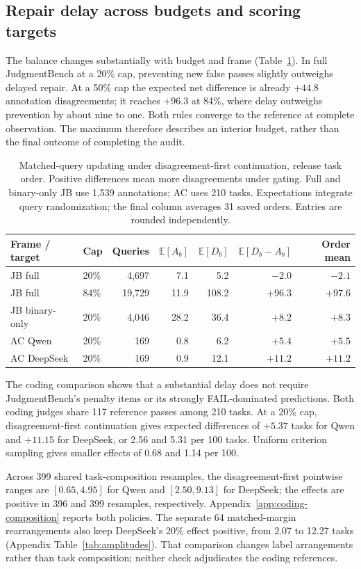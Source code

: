 \documentclass[10pt,letterpaper]{article}
\newcommand{\E}{\mathbb{E}}
\begin{document}
\subsection{Repair delay across budgets and scoring targets}
The balance changes substantially with budget and frame (Table~\ref{tab:update}). In full JudgmentBench at a 20\% cap, preventing new false passes slightly outweighs delayed repair. At a 50\% cap the expected net difference is already $+44.8$ annotation disagreements; it reaches $+96.3$ at 84\%, where delay outweighs prevention by about nine to one. Both rules converge to the reference at complete observation. The maximum therefore describes an interior budget, rather than the final outcome of completing the audit.

\begin{table}[t]
\centering\small
\caption{Matched-query updating under disagreement-first continuation, release task order. Positive differences mean more disagreements under gating. Full and binary-only JB use 1,539 annotations; AC uses 210 tasks. Expectations integrate query randomization; the final column averages 31 saved orders. Entries are rounded independently.}
\label{tab:update}
\begin{tabular}{llrrrrr}
\toprule
Frame / target & Cap & Queries & $\E[A_b]$ & $\E[D_b]$ & $\E[D_b-A_b]$ & Order mean\\
\midrule
JB full & 20\% & 4,697 & 7.1 & 5.2 & $-2.0$ & $-2.1$\\
JB full & 84\% & 19,729 & 11.9 & 108.2 & $+96.3$ & $+97.6$\\
JB binary-only & 20\% & 4,046 & 28.2 & 36.4 & $+8.2$ & $+8.3$\\
AC Qwen & 20\% & 169 & 0.8 & 6.2 & $+5.4$ & $+5.5$\\
AC DeepSeek & 20\% & 169 & 0.9 & 12.1 & $+11.2$ & $+11.2$\\
\bottomrule
\end{tabular}
\end{table}

The coding comparison shows that a substantial delay does not require JudgmentBench's penalty items or its strongly FAIL-dominated predictions. Both coding judges share 117 reference passes among 210 tasks. At a 20\% cap, disagreement-first continuation gives expected differences of $+5.37$ tasks for Qwen and $+11.15$ for DeepSeek, or 2.56 and 5.31 per 100 tasks. Uniform criterion sampling gives smaller effects of 0.68 and 1.14 per 100.

Across 399 shared task-composition resamples, the disagreement-first pointwise ranges are $[0.65,4.95]$ for Qwen and $[2.50,9.13]$ for DeepSeek; the effects are positive in 396 and 399 resamples, respectively. Appendix~\ref{app:coding-composition} reports both policies. The separate 64 matched-margin rearrangements also keep DeepSeek's 20\% effect positive, from 2.07 to 12.27 tasks (Appendix Table~\ref{tab:amplitudes}). That comparison changes label arrangements rather than task composition; neither check adjudicates the coding references.
\end{document}
